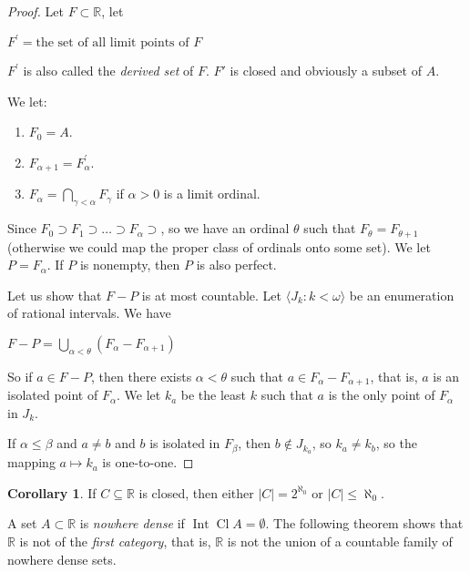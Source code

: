 \documentclass[8pt]{article}
\theoremstyle{definition}
\theoremstyle{definition}
\theoremstyle{definition}
\theoremstyle{definition}
\theoremstyle{definition}
\theoremstyle{definition}
\theoremstyle{definition}
\theoremstyle{definition}
\theoremstyle{definition}
\theoremstyle{definition}
\theoremstyle{definition}
\theoremstyle{definition}
\theoremstyle{definition}
\theoremstyle{definition}
\newtheorem{col}{Corollary}[section]
\theoremstyle{question}
\begin{document}
\begin{proof}

\item Let $F \subset \mathbb{R}$, let
\begin{center}
  $F^{'} = \text{the set of all limit points of $F$}$
\end{center}
$F^{'}$ is also called the \emph{derived set} of $F$. $F'$ is closed and obviously a subset of $A$. 

We let:
\begin{enumerate}
  \item $F_0 = A$.
  \item $F_{\alpha+1} = F^{'}_{\alpha}$.
  \item $F_{\alpha} = \bigcap \limits_{\gamma < \alpha} F_{\gamma}$ if $\alpha > 0$ is a limit ordinal.
\end{enumerate}

Since $F_0 \supset F_1 \supset \dots \supset F_{\alpha} \supset$, so we have an ordinal $\theta$ such that 
$F_{\theta} = F_{\theta + 1}$ (otherwise we could map the proper class of ordinals onto some set).
We let $P = F_{\alpha}$. If $P$ is nonempty, then $P$ is also perfect. 

Let us show that $F - P$ is at most countable. 
Let $\langle J_k : k < \omega \rangle$ be an enumeration of rational intervals. We have
\begin{center}
$F - P = \bigcup \limits_{\alpha < \theta} (F_{\alpha} - F_{\alpha + 1})$
\end{center}
So if $a \in F - P$, then there exists $\alpha < \theta$ such that $a \in F_{\alpha} - F_{\alpha + 1}$, that is,
$a$ is an isolated point of $F_{\alpha}$. We let $k_a$ be the least $k$ such that $a$ 
is the only point of $F_{\alpha}$ in $J_k$. 

If $\alpha \leq \beta$ and $a \neq b$ and $b$ is isolated in $F_{\beta}$, then $b \notin J_{k_a}$, so $k_a \neq k_b$, so
the mapping $a \mapsto k_a$ is one-to-one.

\end{proof}

\begin{col}
  If $C \subseteq \mathbb{R}$ is closed, then either $|C| = 2^{\aleph_0}$ or $|C| \leq \aleph_0$.
\end{col}

A set $A \subset \mathbb{R}$ is \emph{nowhere dense} if $\operatorname{Int}\operatorname{Cl} A = \emptyset$.
The following theorem shows that $\mathbb{R}$ is not of the \emph{first category}, that is,
$\mathbb{R}$ is not the union of a countable family of nowhere dense sets.
\end{document}
